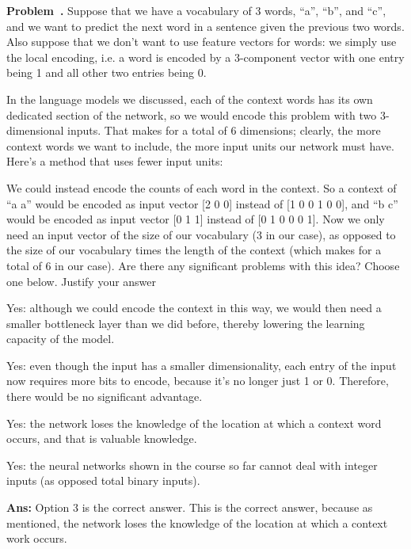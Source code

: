 \documentclass{article}
\newcounter{problem}[section]
\newenvironment{problem}[1][]{\refstepcounter{problem}\par\medskip
   \noindent \textbf{Problem~\theproblem. #1} \rmfamily}{\medskip}
\newenvironment{proof}{\begin{mdframed}\textbf{Ans:}}{ \end{mdframed}}
\begin{document}
\begin{problem}
    Suppose that we have a vocabulary of 3 words, “a”, “b”, and “c”, and we want to predict the next word in a sentence given the previous two words. Also suppose that we don’t want to use feature vectors for words: we simply use the local encoding, i.e. a word is encoded by a 3-component vector with one entry being 1 and all other two entries being 0. 

    In the language models we discussed, each of the context words has its own dedicated section of the network, so we would encode this problem with two 3-dimensional inputs. That makes for a total of 6 dimensions; clearly, the more context words we want to include, the more input units our network must have. Here’s a method that uses fewer input units: 

    We could instead encode the counts of each word in the context. So a context of “a a” would be encoded as input vector [2 0 0] instead of [1 0 0 1 0 0], and “b c” would be encoded as input vector [0 1 1] instead of [0 1 0 0 0 1]. Now we only need an input vector of the size of our vocabulary (3 in our case), as opposed to the size of our vocabulary times the length of the context (which makes for a total of 6 in our case). Are there any significant problems with this idea? Choose one below. Justify your answer

    \begin{enumerate}
        \item Yes: although we could encode the context in this way, we would then need a smaller bottleneck layer than we did before, thereby lowering the learning capacity of the model.
        \item Yes: even though the input has a smaller dimensionality, each entry of the input now requires more bits to encode, because it’s no longer just 1 or 0. Therefore, there would be no significant advantage.
        {
        \color{ForestGreen}
        {
        \item Yes: the network loses the knowledge of the location at which a context word occurs, and that is valuable knowledge.
        }
        }
        \item Yes: the neural networks shown in the course so far cannot deal with integer inputs (as opposed total binary inputs).
    \end{enumerate}

        \begin{proof}
            Option 3 is the correct answer. This is the correct answer, because as mentioned, the network loses the knowledge of the location at which a context work occurs.
        \end{proof}

\end{problem}
\end{document}

